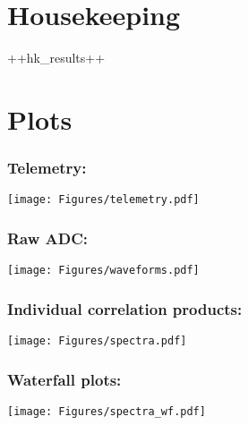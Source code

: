 \section{Housekeeping}

++hk_results++

\section{Plots}

\subsubsection*{Telemetry:}
\texttt{[image: Figures/telemetry.pdf]}


\subsubsection*{Raw ADC:}
\texttt{[image: Figures/waveforms.pdf]}


\subsubsection*{Individual correlation products:}
\texttt{[image: Figures/spectra.pdf]}

\newpage
\subsubsection*{Waterfall plots:}
\texttt{[image: Figures/spectra\_wf.pdf]}

